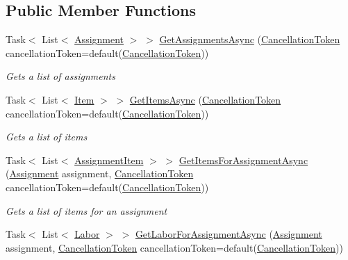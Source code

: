 \subsection*{Public Member Functions}
\begin{DoxyCompactItemize}
\item 
Task$<$ List$<$ \hyperlink{class_field_service_1_1_data_1_1_assignment}{Assignment} $>$ $>$ \hyperlink{interface_field_service_1_1_i_assignment_service_a96a0c030ee4794c243f7b18e4b174a7a}{Get\+Assignments\+Async} (\hyperlink{_view_models_2_assignment_view_model_8cs_aba80ec766846c61f55644fd23860cb18}{Cancellation\+Token} cancellation\+Token=default(\hyperlink{_view_models_2_assignment_view_model_8cs_aba80ec766846c61f55644fd23860cb18}{Cancellation\+Token}))
\begin{DoxyCompactList}\small\item\em Gets a list of assignments \end{DoxyCompactList}\item 
Task$<$ List$<$ \hyperlink{class_field_service_1_1_data_1_1_item}{Item} $>$ $>$ \hyperlink{interface_field_service_1_1_i_assignment_service_aaaa7089a8b70a8ccb8910882cbfcbd69}{Get\+Items\+Async} (\hyperlink{_view_models_2_assignment_view_model_8cs_aba80ec766846c61f55644fd23860cb18}{Cancellation\+Token} cancellation\+Token=default(\hyperlink{_view_models_2_assignment_view_model_8cs_aba80ec766846c61f55644fd23860cb18}{Cancellation\+Token}))
\begin{DoxyCompactList}\small\item\em Gets a list of items \end{DoxyCompactList}\item 
Task$<$ List$<$ \hyperlink{class_field_service_1_1_data_1_1_assignment_item}{Assignment\+Item} $>$ $>$ \hyperlink{interface_field_service_1_1_i_assignment_service_a9e4b9011309a1ffbb9806d3db8c28ac3}{Get\+Items\+For\+Assignment\+Async} (\hyperlink{class_field_service_1_1_data_1_1_assignment}{Assignment} assignment, \hyperlink{_view_models_2_assignment_view_model_8cs_aba80ec766846c61f55644fd23860cb18}{Cancellation\+Token} cancellation\+Token=default(\hyperlink{_view_models_2_assignment_view_model_8cs_aba80ec766846c61f55644fd23860cb18}{Cancellation\+Token}))
\begin{DoxyCompactList}\small\item\em Gets a list of items for an assignment \end{DoxyCompactList}\item 
Task$<$ List$<$ \hyperlink{class_field_service_1_1_data_1_1_labor}{Labor} $>$ $>$ \hyperlink{interface_field_service_1_1_i_assignment_service_ac5dc739d70dee25a86e0107786a19ab6}{Get\+Labor\+For\+Assignment\+Async} (\hyperlink{class_field_service_1_1_data_1_1_assignment}{Assignment} assignment, \hyperlink{_view_models_2_assignment_view_model_8cs_aba80ec766846c61f55644fd23860cb18}{Cancellation\+Token} cancellation\+Token=default(\hyperlink{_view_models_2_assignment_view_model_8cs_aba80ec766846c61f55644fd23860cb18}{Cancellation\+Token}))

\end{DoxyCompactItemize}

